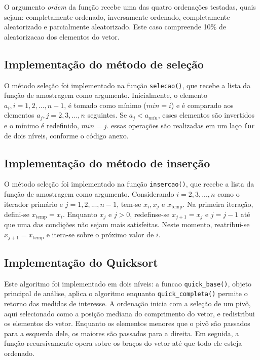 \documentclass[
]{article}
\begin{document}
O argumento \emph{ordem} da função recebe uma das quatro ordenações
testadas, quais sejam: completamente ordenado, inversamente ordenado,
completamente aleatorizado e parcialmente aleatorizado. Este caso
compreende 10\% de aleatorizacao dos elementos do vetor.

\hypertarget{implementauxe7uxe3o-do-muxe9todo-de-seleuxe7uxe3o}{%
\subsection{Implementação do método de
seleção}\label{implementauxe7uxe3o-do-muxe9todo-de-seleuxe7uxe3o}}

O método seleção foi implementado na função \texttt{selecao()}, que
recebe a lista da função de amostragem como argumento. Inicialmente, o
elemento \(a_i, i = 1, 2, ..., n-1\), é tomado como mínimo (\(min = i\))
e é comparado aos elementos \(a_j, j = 2, 3, ..., n\) seguintes. Se
\(a_j < a_{min}\), esses elementos são invertidos e o mínimo é
redefinido, \(min = j\). essas operações são realizadas em um laço
\texttt{for} de dois níveis, conforme o código anexo.

\hypertarget{implementauxe7uxe3o-do-muxe9todo-de-inseruxe7uxe3o}{%
\subsection{Implementação do método de
inserção}\label{implementauxe7uxe3o-do-muxe9todo-de-inseruxe7uxe3o}}

O método seleção foi implementado na função \texttt{insercao()}, que
recebe a lista da função de amostragem como argumento. Considerando
\(i = 2, 3, ..., n\) como o iterador primário e \(j = 1, 2, ..., n-1\),
tem-se \(x_i, x_j\) e \(x_{\text{temp}}\). Na primeira iteração,
defini-se \(x_{\text{temp}} = x_i\). Enquanto \(x_j\) e \(j>0\),
redefinse-se \(x_{j+1} = x_j\) e \(j = j-1\) até que uma das condições
não sejam mais satisfeitas. Neste momento, reatribui-se
\(x_{j+1} = x_{\text{temp}}\) e itera-se sobre o próximo valor de \(i\).

\hypertarget{implementauxe7uxe3o-do-quicksort}{%
\subsection{Implementação do
Quicksort}\label{implementauxe7uxe3o-do-quicksort}}

Este algoritmo foi implementado em dois níveis: a funcao
\texttt{quick\_base()}, objeto principal de análise, aplica o algoritmo
enquanto \texttt{quick\_completa()} permite o retorno das medidas de
interesse. A ordenação inicia com a seleção de um pivô, aqui selecionado
como a posição mediana do comprimento do vetor, e redistribui os
elementos do vetor. Enquanto os elementos menores que o pivô são
passados para a esquerda dele, os maiores são passados para a direita.
Em seguida, a função recursivamente opera sobre os braços do vetor até
que todo ele esteja ordenado.
\end{document}
